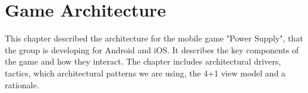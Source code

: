 \chapter{Game Architecture}

	This chapter described the architecture for the mobile game "Power Supply", that the group is 
	developing for Android and iOS. It describes the key components of the game and how they interact. 
	The chapter includes architectural drivers, tactics, which architectural patterns we are using, 
	the 4+1 view model and a rationale.